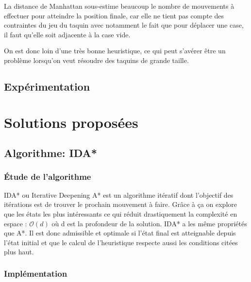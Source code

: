 \documentclass[a4paper, 12pt]{article}
\begin{document}
La distance de Manhattan sous-estime beaucoup le nombre de mouvements à effectuer pour atteindre la position finale, car elle ne tient pas compte des contraintes du jeu du taquin avec notamment le fait que pour déplacer une case, il faut qu'elle soit adjacente à la case vide.

On est donc loin d'une très bonne heuristique, ce qui peut s'avérer être un problème lorsqu'on veut résoudre des taquins de grande taille.

\subsection{Expérimentation}

\section{Solutions proposées}

\subsection{Algorithme: IDA*}

\subsubsection{Étude de l'algorithme}

IDA* ou Iterative Deepening A* est un algorithme itératif dont l'objectif des itérations est de trouver le prochain mouvement à faire.
Grâce à ça on explore que les états les plus intéressants ce qui réduit drastiquement la complexité en espace : $\mathcal{O}(d)$ où d est la profondeur de la solution.
IDA* a les même propriétés que A*. Il est donc admissible et optimale si l'état final est atteignable depuis l'état initial et que le calcul de l'heuristique respecte aussi les conditions citées plus haut.

\subsubsection{Implémentation}
\end{document}
